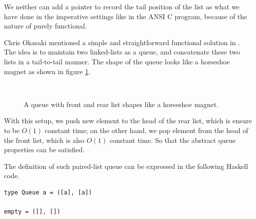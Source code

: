 \documentclass{article}
\begin{document}
We neither can add a pointer to record the tail position of the list
as what we have done in the imperative settings like in the ANSI C program,
because of the nature of purely functional.

Chris Okasaki mentioned a simple and straightforward functional solution
in \cite{okasaki-book}. The idea is to maintain two linked-lists as a queue,
and concatenate these two lists in a tail-to-tail manner. The shape of the queue
looks like a horseshoe magnet as shown in figure \ref{fig:horseshoe-magnet}.

\begin{figure}[htbp]
  \centering
   \\
  \caption{A queue with front and rear list shapes like a horseshoe magnet.} \label{fig:horseshoe-magnet}
\end{figure}

With this setup, we push new element to the head of the rear list, which is
ensure to be $O(1)$ constant time; on the other hand, we pop element from
the head of the front list, which is also $O(1)$ constant time.
So that the abstract queue properties can be satisfied.

The definition of such paired-list queue can be expressed in the following
Haskell code.

\lstset{language=Haskell}
\begin{lstlisting}
type Queue a = ([a], [a])

empty = ([], [])
\end{lstlisting}
\end{document}
